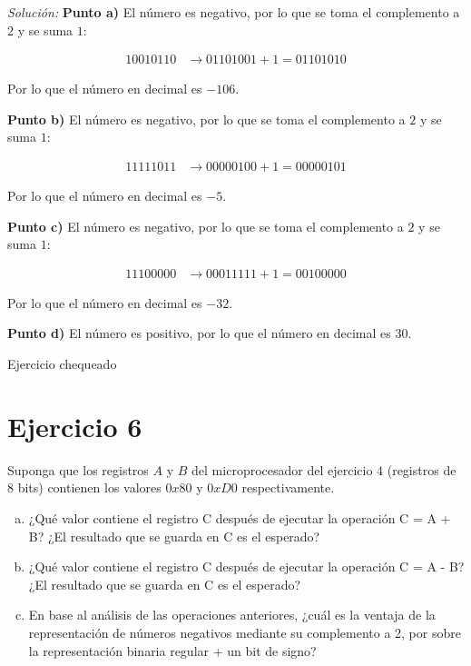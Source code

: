\documentclass{article}
\newcounter{ejer}[section]
\newenvironment{solution}
    {\textit{Solución:}}
    {}
\begin{document}
\begin{solution}
\textbf{Punto a)}
El número es negativo, por lo que se toma el complemento a $2$ y se suma $1$:

\begin{align*}
    10010110 &\rightarrow 01101001 + 1 = 01101010
\end{align*}

Por lo que el número en decimal es $-106$.

\textbf{Punto b)}
El número es negativo, por lo que se toma el complemento a $2$ y se suma $1$:

\begin{align*}
    11111011 &\rightarrow 00000100 + 1 = 00000101
\end{align*}

Por lo que el número en decimal es $-5$.

\textbf{Punto c)}
El número es negativo, por lo que se toma el complemento a $2$ y se suma $1$:

\begin{align*}
    11100000 &\rightarrow 00011111 + 1 = 00100000
\end{align*}

Por lo que el número en decimal es $-32$.

\textbf{Punto d)}
El número es positivo, por lo que el número en decimal es $30$.

\end{solution}

{\color{green} Ejercicio chequeado}

\section*{Ejercicio 6}
Suponga que los registros $A$ y $B$ del microprocesador del ejercicio $4$ (registros de 8 bits) contienen los valores $0x80$ y $0xD0$ respectivamente.
\begin{enumerate}[a)]
    \item ¿Qué valor contiene el registro C después de ejecutar la operación C = A + B?
    \newline ¿El resultado que se guarda en C es el esperado?
    \item ¿Qué valor contiene el registro C después de ejecutar la operación C = A - B?
    \newline ¿El resultado que se guarda en C es el esperado?
    \item En base al análisis de las operaciones anteriores, ¿cuál es la ventaja de la
    representación de números negativos mediante su complemento a 2, por sobre la
    representación binaria regular + un bit de signo?
\end{enumerate}
\end{document}
